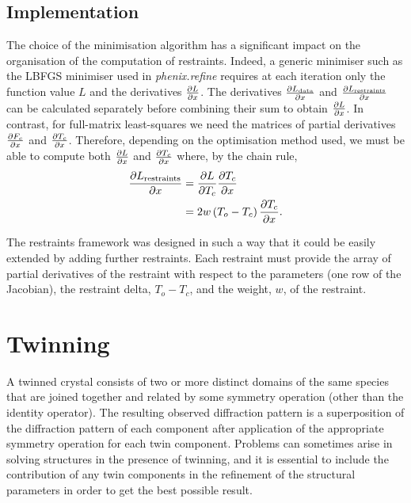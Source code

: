 \documentclass[pdf]{iucr}
\begin{document}
\subsection{Implementation}

The choice of the minimisation algorithm has a significant impact on the organisation of the computation of restraints. Indeed, a generic minimiser such as the LBFGS minimiser used in \emph{phenix.refine} \cite{Afonine:2012aa} requires at each iteration only the function value $L$ and the derivatives $\frac{\partial L}{\partial x}$. The derivatives $\frac{\partial L_{\text{data}}}{\partial x}$ and $\frac{\partial L_{\text{restraints}}}{\partial x}$ can be calculated separately before combining their sum to obtain $\frac{\partial L}{\partial x}$. In contrast, for full-matrix least-squares we need the matrices of partial derivatives $\frac{\partial F_c}{\partial x}$ and $\frac{\partial T_c}{\partial x}$. Therefore, depending on the optimisation method used, we must be able to compute both $\frac{\partial L}{\partial x}$ and $\frac{\partial T_c}{\partial x}$ where, by the chain rule,
\begin{align}
\frac{\partial L_{\text{restraints}}}{\partial x} &= \frac{\partial L}{\partial T_c} \frac{\partial T_c}{\partial x} \nonumber\\
                             &= 2 w \left(T_o - T_c \right) \frac{\partial T_c}{\partial x}.
\end{align}

The restraints framework was designed in such a way that it could be easily extended by adding further restraints. Each restraint must provide the array of partial derivatives of the restraint with respect to the parameters (one row of the Jacobian), the restraint delta, $T_o - T_c$, and the weight, $w$, of the restraint.


\section{Twinning}
\label{sec:ls_twinning}

A twinned crystal consists of two or more distinct domains of the same species that are joined together and related by some symmetry operation (other than the identity operator). The resulting observed diffraction pattern is a superposition of the diffraction pattern of each component after application of the appropriate symmetry operation for each twin component. Problems can sometimes arise in solving structures in the presence of twinning, and it is essential to include the contribution of any twin components in the refinement of the structural parameters in order to get the best possible result.
\end{document}

